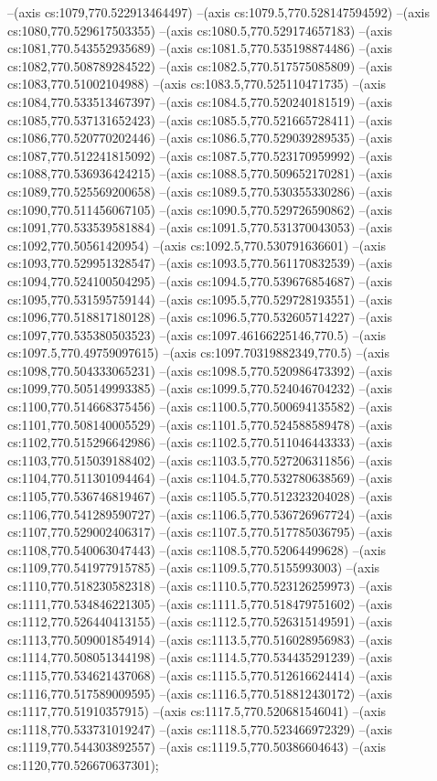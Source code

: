 --(axis cs:1079,770.522913464497)
--(axis cs:1079.5,770.528147594592)
--(axis cs:1080,770.529617503355)
--(axis cs:1080.5,770.529174657183)
--(axis cs:1081,770.543552935689)
--(axis cs:1081.5,770.535198874486)
--(axis cs:1082,770.508789284522)
--(axis cs:1082.5,770.517575085809)
--(axis cs:1083,770.51002104988)
--(axis cs:1083.5,770.525110471735)
--(axis cs:1084,770.533513467397)
--(axis cs:1084.5,770.520240181519)
--(axis cs:1085,770.537131652423)
--(axis cs:1085.5,770.521665728411)
--(axis cs:1086,770.520770202446)
--(axis cs:1086.5,770.529039289535)
--(axis cs:1087,770.512241815092)
--(axis cs:1087.5,770.523170959992)
--(axis cs:1088,770.536936424215)
--(axis cs:1088.5,770.509652170281)
--(axis cs:1089,770.525569200658)
--(axis cs:1089.5,770.530355330286)
--(axis cs:1090,770.511456067105)
--(axis cs:1090.5,770.529726590862)
--(axis cs:1091,770.533539581884)
--(axis cs:1091.5,770.531370043053)
--(axis cs:1092,770.50561420954)
--(axis cs:1092.5,770.530791636601)
--(axis cs:1093,770.529951328547)
--(axis cs:1093.5,770.561170832539)
--(axis cs:1094,770.524100504295)
--(axis cs:1094.5,770.539676854687)
--(axis cs:1095,770.531595759144)
--(axis cs:1095.5,770.529728193551)
--(axis cs:1096,770.518817180128)
--(axis cs:1096.5,770.532605714227)
--(axis cs:1097,770.535380503523)
--(axis cs:1097.46166225146,770.5)
--(axis cs:1097.5,770.49759097615)
--(axis cs:1097.70319882349,770.5)
--(axis cs:1098,770.504333065231)
--(axis cs:1098.5,770.520986473392)
--(axis cs:1099,770.505149993385)
--(axis cs:1099.5,770.524046704232)
--(axis cs:1100,770.514668375456)
--(axis cs:1100.5,770.500694135582)
--(axis cs:1101,770.508140005529)
--(axis cs:1101.5,770.524588589478)
--(axis cs:1102,770.515296642986)
--(axis cs:1102.5,770.511046443333)
--(axis cs:1103,770.515039188402)
--(axis cs:1103.5,770.527206311856)
--(axis cs:1104,770.511301094464)
--(axis cs:1104.5,770.532780638569)
--(axis cs:1105,770.536746819467)
--(axis cs:1105.5,770.512323204028)
--(axis cs:1106,770.541289590727)
--(axis cs:1106.5,770.536726967724)
--(axis cs:1107,770.529002406317)
--(axis cs:1107.5,770.517785036795)
--(axis cs:1108,770.540063047443)
--(axis cs:1108.5,770.52064499628)
--(axis cs:1109,770.541977915785)
--(axis cs:1109.5,770.5155993003)
--(axis cs:1110,770.518230582318)
--(axis cs:1110.5,770.523126259973)
--(axis cs:1111,770.534846221305)
--(axis cs:1111.5,770.518479751602)
--(axis cs:1112,770.526440413155)
--(axis cs:1112.5,770.526315149591)
--(axis cs:1113,770.509001854914)
--(axis cs:1113.5,770.516028956983)
--(axis cs:1114,770.508051344198)
--(axis cs:1114.5,770.534435291239)
--(axis cs:1115,770.534621437068)
--(axis cs:1115.5,770.512616624414)
--(axis cs:1116,770.517589009595)
--(axis cs:1116.5,770.518812430172)
--(axis cs:1117,770.51910357915)
--(axis cs:1117.5,770.520681546041)
--(axis cs:1118,770.533731019247)
--(axis cs:1118.5,770.523466972329)
--(axis cs:1119,770.544303892557)
--(axis cs:1119.5,770.50386604643)
--(axis cs:1120,770.526670637301);

